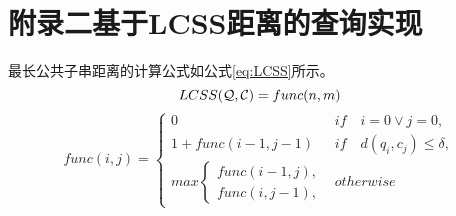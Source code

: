 \chapter*{附录二\quad 基于LCSS距离的查询实现}
\vskip 5mm
最长公共子串距离的计算公式如公式\ref{eq:LCSS}所示。
\begin{equation}\label{eq:LCSS}
	LCSS({\cal Q},{\cal C})= func(n, m)
\end{equation}
\begin{equation*}	
func(i,j)=
\begin{cases}
0  & if \quad i=0 \lor j=0,\\ 
1 + func(i-1, j-1) & if \quad d(q_{i}, c_{j}) \le \delta, \\
max 
\begin{cases}
func(i-1,j),\\
func(i,j-1),
\end{cases} & otherwise
\end{cases}
\end{equation*}

